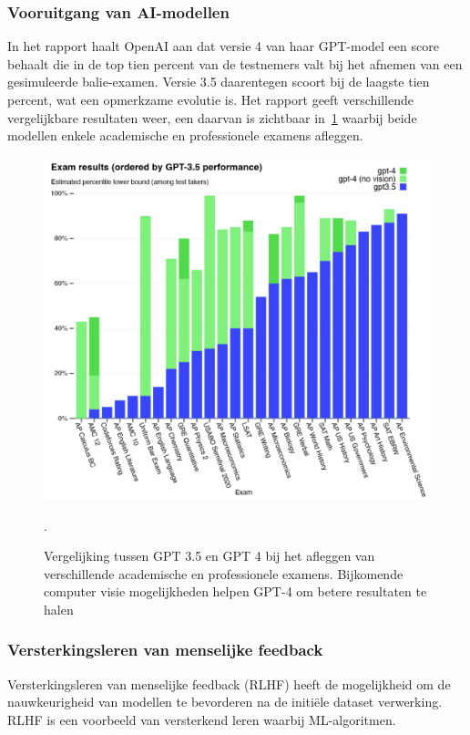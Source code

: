 \subsubsection{Vooruitgang van AI-modellen}
In het rapport haalt OpenAI aan dat versie 4 van haar GPT-model een score behaalt die in de top tien percent van de testnemers valt bij het afnemen van een gesimuleerde balie-examen.
Versie 3.5 daarentegen scoort bij de laagste tien percent, wat een opmerkzame evolutie is.
Het rapport geeft verschillende vergelijkbare resultaten weer, een daarvan is zichtbaar in~\ref{fig:gpt3.5-versus-4} waarbij beide modellen enkele academische en professionele examens afleggen.
\begin{figure}
    \includegraphics[width=1\linewidth]{images/gpt35-vs-4-exam-results}
    \caption{Vergelijking tussen GPT 3.5 en GPT 4 bij het afleggen van verschillende academische en professionele examens. Bijkomende computer visie mogelijkheden helpen GPT-4 om betere resultaten te halen~\autocite{OpenAI2023}}.
    \label{fig:gpt3.5-versus-4}
\end{figure}

\subsubsection{Versterkingsleren van menselijke feedback}
Versterkingsleren van menselijke feedback (RLHF) heeft de mogelijkheid om de nauwkeurigheid van modellen te bevorderen na de initi\"ele dataset verwerking.
RLHF is een voorbeeld van versterkend leren waarbij ML-algoritmen.

